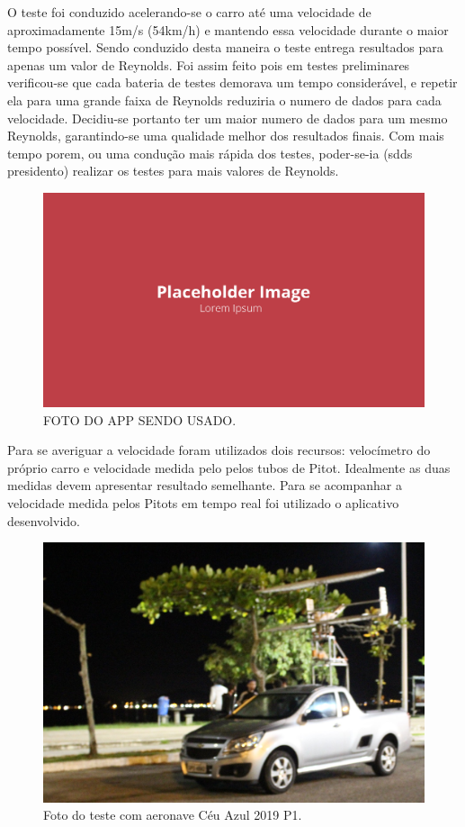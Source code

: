O teste foi conduzido acelerando-se o carro até uma velocidade de aproximadamente 15m/s (54km/h) e mantendo essa velocidade durante o maior tempo possível. Sendo conduzido desta maneira o teste entrega resultados para apenas um valor de Reynolds. Foi assim feito pois em testes preliminares verificou-se que cada bateria de testes demorava um tempo considerável, e repetir ela para uma grande faixa de Reynolds reduziria o numero de dados para cada velocidade. Decidiu-se portanto ter um maior numero de dados para um mesmo Reynolds, garantindo-se uma qualidade melhor dos resultados finais. Com mais tempo porem, ou uma condução mais rápida dos testes, poder-se-ia (sdds presidento) realizar os testes para mais valores de Reynolds.  

\begin{figure}[!ht]
    \centering
    \includegraphics[width=.8\linewidth]{figuras/outras/placeholder.png}
    \caption{FOTO DO APP SENDO USADO\cite{autor}.}
    \label{fig:placeholder}
\end{figure}

Para se averiguar a velocidade foram utilizados dois recursos: velocímetro do próprio carro e velocidade medida pelo pelos tubos de Pitot. Idealmente as duas medidas devem apresentar resultado semelhante. Para se acompanhar a velocidade medida pelos Pitots em tempo real foi utilizado o aplicativo desenvolvido.

\begin{figure}[!ht]
    \centering
    \includegraphics[width=.8\linewidth]{figuras/testes/teste_aviao_completo.JPG}
    \caption{Foto do teste com aeronave Céu Azul 2019 P1\cite{autor}.}
    \label{fig:foto_teste_aviao}
\end{figure}

